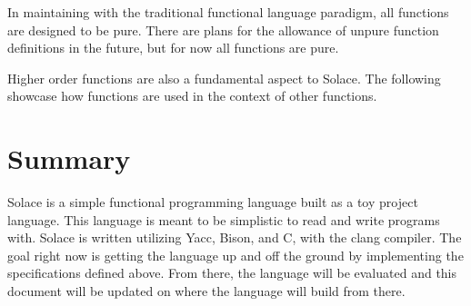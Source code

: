 \documentclass{article}
\begin{document}
In maintaining with the traditional functional language paradigm, all functions are
designed to be pure. There are plans for the allowance of unpure function definitions
in the future, but for now all functions are pure.

Higher order functions are also a fundamental aspect to Solace. The following showcase
how functions are used in the context of other functions.

\section{Summary}
Solace is a simple functional programming language built as a toy project language.
This language is meant to be simplistic to read and write programs with. Solace is written 
utilizing Yacc, Bison, and C, with the clang compiler.
The goal right now is getting the language up and off the ground by implementing the
specifications defined above. From there, the language will be evaluated and this document
will be updated on where the language will build from there.
\end{document}
